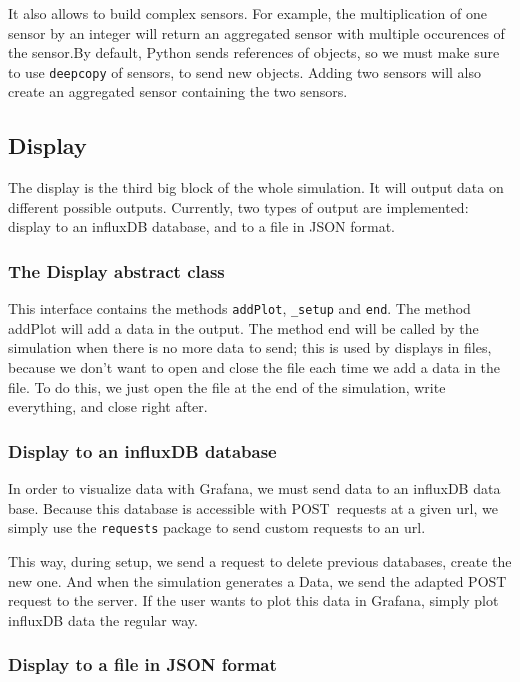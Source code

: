 It also allows to build complex sensors. For example, the multiplication of one
sensor by an integer will return an aggregated sensor with multiple occurences
of the sensor.By default, Python sends references of objects, so we must make
sure to use \verb!deepcopy! of sensors, to send new objects. Adding two sensors
will also create an aggregated sensor containing the two sensors.

\subsection{Display}

The display is the third big block of the whole simulation. It will output data
on different possible outputs. Currently, two types of output are implemented:
display to an influxDB database, and to a file in JSON format.

\subsubsection{The Display abstract class}

This interface contains the methods \verb!addPlot!, \verb!_setup! and
\verb!end!. The method addPlot will add a data in the output. The method end
will be called by the simulation when there is no more data to send; this is
used by displays in files, because we don't want to open and close the file
each time we add a data in the file. To do this, we just open the file at the
end of the simulation, write everything, and close right after.

\subsubsection{Display to an influxDB database}

In order to visualize data with Grafana, we must send data to an influxDB data
base. Because this database is accessible with POST requests at a given url, we
simply use the \verb!requests! package to send custom requests to an url.

This way, during setup, we send a request to delete previous databases, create
the new one. And when the simulation generates a Data, we send the adapted POST
request to the server. If the user wants to plot this data in Grafana, simply
plot influxDB data the regular way.

\subsubsection{Display to a file in JSON format}

